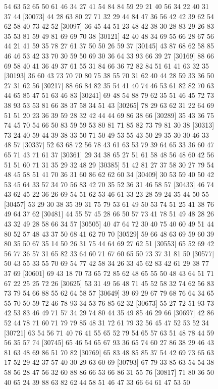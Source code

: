 \documentclass{article}
\begin{document}
\begin{figure}[H]
\begin{Schunk}
\begin{Soutput}
[30049] 54 63 52 65 50 61 46 34 27 41 54 84 84 59 29 21 40 56 34 22 40 31 37 44
[30073] 44 28 63 80 27 71 32 29 44 84 47 36 56 42 42 39 62 54 62 58 40 73 42 52
[30097] 36 45 44 51 23 48 42 38 30 28 83 29 26 83 35 53 81 59 49 81 69 69 70 38
[30121] 42 40 48 34 69 55 66 28 67 56 44 21 41 59 35 78 27 61 37 50 50 26 59 37
[30145] 43 87 68 62 58 85 46 46 53 42 33 70 30 59 50 69 30 36 64 33 93 66 39 27
[30169] 88 66 69 58 40 41 36 49 37 61 55 31 84 66 36 72 82 84 51 61 41 63 32 35
[30193] 36 60 43 73 70 70 80 75 38 55 70 31 62 40 44 28 59 33 36 50 27 31 62 56
[30217] 88 66 84 82 35 54 41 40 74 46 53 61 82 82 70 63 44 65 85 47 51 63 46 83
[30241] 69 48 54 88 79 62 35 51 46 45 72 73 38 93 53 53 81 66 38 37 58 34 51 43
[30265] 78 29 63 62 31 22 64 69 51 51 20 23 36 39 59 28 32 42 44 44 69 86 38 66
[30289] 35 43 36 75 74 45 70 54 66 50 83 59 59 53 80 81 71 85 82 73 79 81 30 38
[30313] 73 24 40 59 44 39 38 33 50 71 50 49 53 55 43 50 29 35 30 30 46 33 48 57
[30337] 52 63 68 72 56 78 43 61 63 53 79 39 64 65 33 36 60 47 65 71 43 71 61 37
[30361] 29 34 38 65 27 51 61 58 48 56 48 60 42 56 51 51 60 71 31 35 29 32 48 29
[30385] 51 42 81 27 37 58 30 27 79 54 48 45 58 51 41 70 36 31 60 86 62 62 60 34
[30409] 30 53 59 40 50 42 53 45 64 33 57 34 70 56 83 42 70 35 52 36 31 46 58 57
[30433] 46 74 43 62 45 22 36 26 69 54 51 62 53 46 61 33 23 28 59 24 35 44 50 55
[30457] 53 29 30 38 35 39 31 75 79 53 61 49 50 53 74 51 25 41 38 76 49 64 37 62
[30481] 44 55 57 45 28 66 50 57 73 41 78 51 49 48 28 26 43 32 49 28 58 66 34 57
[30505] 40 47 64 72 30 40 75 40 60 49 51 44 80 52 57 48 43 37 50 68 41 62 70 70
[30529] 59 66 48 63 69 59 60 39 80 35 50 67 35 14 50 26 31 75 44 64 69 27 62 51
[30553] 65 52 69 42 56 77 36 57 31 65 82 33 64 60 71 67 60 65 50 73 37 31 81 50
[30577] 50 43 55 33 55 70 69 54 77 42 58 34 26 33 45 62 83 42 61 29 38 77 37 69
[30601] 69 43 18 70 73 65 72 85 62 48 65 55 50 48 43 64 51 71 67 22 25 25 72 26
[30625] 53 31 49 56 48 71 45 52 58 32 74 62 56 83 73 79 54 66 88 55 62 64 58 57
[30649] 39 69 29 67 79 68 76 64 34 65 55 70 50 59 72 46 78 93 34 53 76 85 62 32
[30673] 55 27 72 51 93 73 42 53 83 46 49 71 57 34 29 74 80 44 35 49 85 46 29 66
[30697] 42 86 52 44 78 71 60 71 79 79 85 48 31 72 61 79 32 56 45 47 52 53 52 34
[30721] 63 54 56 71 40 76 41 55 65 52 79 54 65 57 63 51 48 78 44 59 56 35 57 74
[30745] 65 46 54 65 67 93 36 65 74 60 27 86 38 29 46 43 81 63 48 69 86 51 70 82
[30769] 65 83 48 85 85 37 54 42 69 73 65 63 17 52 29 42 37 57 40 30 29 63 60 69
[30793] 67 79 33 85 63 54 54 38 58 56 28 47 56 32 60 88 86 66 53 66 86 31 55 76
[30817] 71 80 36 50 40 65 24 39 88 63 82 62 44 58 51 46 47 33 66 64 61 47 53 50

\end{Soutput}
\end{Schunk}
\end{figure}
\end{document}
